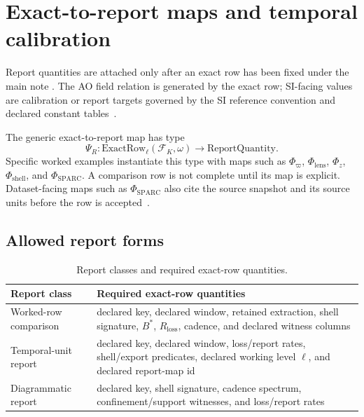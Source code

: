 \section{Exact-to-report maps and temporal calibration}
\label{man:exact-to-report-maps}

Report quantities are attached only after an exact row has been fixed under the main note \cite{aod43_main_2026}. The AO field relation is generated by the exact row; SI-facing values are calibration or report targets governed by the SI reference convention and declared constant tables~\cite{bipm_si_brochure_2025,nist_constants_complete}.

The generic exact-to-report map has type
\[
\Psi_R:
\mathrm{ExactRow}_{\ell}(\mathcal F_K,\omega)
\longrightarrow
\mathrm{ReportQuantity}.
\]
Specific worked examples instantiate this type with maps such as \(\Phi_{\varpi}\), \(\Phi_{\mathrm{lens}}\), \(\Phi_z\), \(\Phi_{\mathrm{shell}}\), and \(\Phi_{\mathrm{SPARC}}\). A comparison row is not complete until its map is explicit. Dataset-facing maps such as \(\Phi_{\mathrm{SPARC}}\) also cite the source snapshot and its source units before the row is accepted~\cite{sparc_paper,sparc_site}.

\subsection{Allowed report forms}
\label{man:allowed-report-forms}

\begin{table}[H]
\centering
\caption{Report classes and required exact-row quantities.}
\label{tab:conversion-classes}
\begin{threeparttable}
\small
\begin{tabularx}{\linewidth}{@{}lX@{}}
\toprule
Report class & Required exact-row quantities \\
\midrule
Worked-row comparison & declared key, declared window, retained extraction, shell signature, \(B^*\), \(R_{\mathrm{loss}}\), cadence, and declared witness columns \\
Temporal-unit report & declared key, declared window, loss/report rates, shell/export predicates, declared working level \(\ell\), and declared report-map id \\
Diagrammatic report & declared key, shell signature, cadence spectrum, confinement/support witnesses, and loss/report rates \\
\bottomrule
\end{tabularx}
\end{threeparttable}
\end{table}

